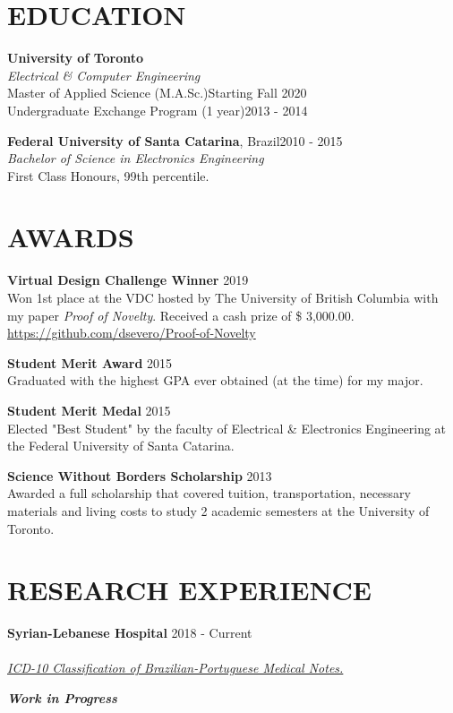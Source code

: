 \documentclass[margin, line]{res}
\begin{document}
\address{More information: \url{https://dsevero.com}}
\begin{resume}

\section{EDUCATION}
\textbf{University of Toronto}\\
{\sl Electrical \& Computer Engineering}\\
Master of Applied Science (M.A.Sc.)\hfill Starting Fall 2020\\
Undergraduate Exchange Program (1 year)\hfill 2013 - 2014

\textbf{Federal University of Santa Catarina}, Brazil\hfill 2010 - 2015 \\
{\sl Bachelor of Science in Electronics Engineering}\\
First Class Honours, 99th percentile.

\section{AWARDS}
\textbf{Virtual Design Challenge Winner} \hfill 2019\\
Won 1st place at the VDC hosted by The University of British Columbia with my paper \emph{Proof of Novelty}. Received a cash prize of \$ 3,000.00.\\
\url{https://github.com/dsevero/Proof-of-Novelty}

\textbf{Student Merit Award} \hfill 2015\\
Graduated with the highest GPA ever obtained (at the time) for my major.

\textbf{Student Merit Medal} \hfill 2015\\
Elected "Best Student" by the faculty of Electrical \& Electronics Engineering at the Federal University of Santa Catarina.

\textbf{Science Without Borders Scholarship} \hfill 2013\\
Awarded a full scholarship that covered tuition, transportation, necessary materials and living costs to study 2 academic semesters at the University of Toronto.

\section{RESEARCH EXPERIENCE}
\textbf{Syrian-Lebanese Hospital} \hfill 2018 - Current\\
\\
\underline{\sl ICD-10 Classification of Brazilian-Portuguese Medical Notes.}\\
\begin{small}
    {\sl \textbf{Work in Progress}}
\end{small}


\end{resume}
\end{document}
